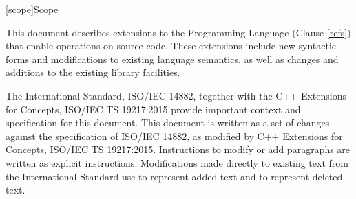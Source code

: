 
[scope]{Scope}

\pnum
This document describes extensions to the \Cpp Programming
Language (Clause \ref{refs}) that enable operations on source code. These
extensions include new syntactic forms and modifications to existing language
semantics, as well as changes and additions to the existing library facilities.

\pnum
The International Standard, ISO/IEC 14882, together with the C++ Extensions for
Concepts, ISO/IEC TS 19217:2015 provide important context and specification for
this document. This document is written as a set of changes against the
specification of ISO/IEC 14882, as modified by C++ Extensions for Concepts,
ISO/IEC TS 19217:2015.  Instructions to modify or add paragraphs are written as
explicit instructions.  Modifications made directly to existing text from the
International Standard use  to represent added text and
 to represent deleted text.
